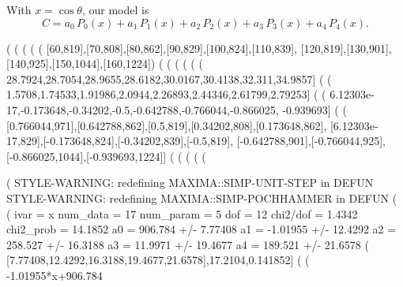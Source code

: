 \documentclass[12pt]{article}
\begin{document}
\noindent With $x = \cos \theta$, our model is
\begin{equation}
  C = a_0\,P_0(x) + a_1\,P_1(x) + a_2\,P_2(x) + a_3\,P_3(x) + a_4\,P_4(x).
\end{equation}   
\begin{myVerbatim}
(%
(%
(%
(%
(%
             [60,819],[70,808],[80,862],[90,829],[100,824],[110,839],
             [120,819],[130,901],[140,925],[150,1044],[160,1224])
(%
(%
(%
(%
(%
(%
       28.7924,28.7054,28.9655,28.6182,30.0167,30.4138,32.311,34.9857]
(%
(%
       1.5708,1.74533,1.91986,2.0944,2.26893,2.44346,2.61799,2.79253]
(%
(%
       6.12303e-17,-0.173648,-0.34202,-0.5,-0.642788,-0.766044,-0.866025,
       -0.939693]
(%
(%
        [0.766044,971],[0.642788,862],[0.5,819],[0.34202,808],[0.173648,862],
        [6.12303e-17,829],[-0.173648,824],[-0.34202,839],[-0.5,819],
        [-0.642788,901],[-0.766044,925],[-0.866025,1044],[-0.939693,1224]]	   
(%
(%
(%
(%
(%
\end{myVerbatim}
\newpage
\begin{myVerbatim}
(%
STYLE-WARNING: redefining MAXIMA::SIMP-UNIT-STEP in DEFUN
STYLE-WARNING: redefining MAXIMA::SIMP-POCHHAMMER in DEFUN
(%
(%
 ivar =  x 
 num_data =  17 
 num_param =  5 
 dof =  12 
 chi2/dof =  1.4342 
 chi2_prob =  14.1852 %
a0 =  906.784  +/-  7.77408 
a1 =  -1.01955  +/-  12.4292 
a2 =  258.527  +/-  16.3188 
a3 =  11.9971  +/-  19.4677 
a4 =  189.521  +/-  21.6578 
(%
        [7.77408,12.4292,16.3188,19.4677,21.6578],17.2104,0.141852]
(%
(%
                                -1.01955*x+906.784
\end{myVerbatim}
\end{document}

